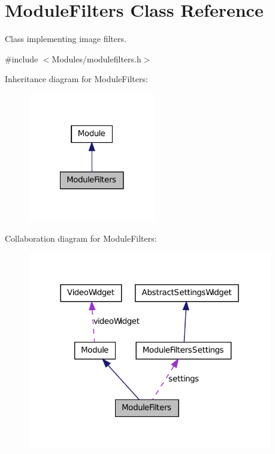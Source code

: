 \hypertarget{class_module_filters}{
\section{ModuleFilters Class Reference}
\label{d9/d65/class_module_filters}
}


Class implementing image filters.  




{\ttfamily \#include $<$Modules/modulefilters.h$>$}



Inheritance diagram for ModuleFilters:\nopagebreak
\begin{figure}[H]
\begin{center}
\leavevmode
\includegraphics[width=158pt]{d5/d96/class_module_filters__inherit__graph}
\end{center}
\end{figure}


Collaboration diagram for ModuleFilters:\nopagebreak
\begin{figure}[H]
\begin{center}
\leavevmode
\includegraphics[width=302pt]{d5/d52/class_module_filters__coll__graph}
\end{center}
\end{figure}
